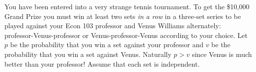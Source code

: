 \documentclass[addpoints,12pt]{exam}
\begin{document}
\begin{questions}
	 

\question You have been entered into a very strange tennis tournament. To get the \$10,000 Grand Prize you must win at least two sets \emph{in a row} in a three-set series to be played against your Econ 103 professor and Venus Williams alternately: professor-Venus-professor or Venus-professor-Venus according to your choice. Let $p$ be the probability that you win a set against your professor and $v$ be the probability that you win a set against Venus. Naturally $p>v$ since Venus is much better than your professor! Assume that each set is independent.
\end{questions}
\end{document}
